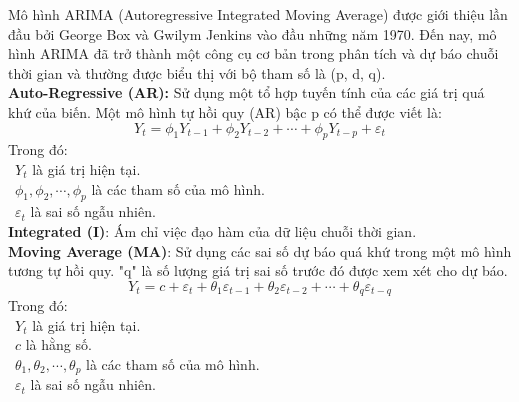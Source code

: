 Mô hình ARIMA (Autoregressive Integrated Moving Average) được giới thiệu lần đầu bởi George Box và Gwilym Jenkins vào đầu những năm 1970. Đến nay, mô hình ARIMA đã trở thành một công cụ cơ bản trong phân tích và dự báo chuỗi thời gian và thường được biểu thị với bộ tham số là (p, d, q).\\
\textbf{Auto-Regressive (AR):} Sử dụng một tổ hợp tuyến tính của các giá trị quá khứ của biến. Một mô hình tự hồi quy (AR) bậc p có thể được viết là:
\[
Y_{t}=\phi_{1}Y_{t-1}+\phi_{2}Y_{t-2}+\cdots+\phi_{p}Y_{t-p}+\varepsilon_{t}
\]
Trong đó:\\
    \indent\textbullet\ \(Y_{t}\) là giá trị hiện tại.\\
    \indent\textbullet\ \(\phi_{1},\phi_{2},\cdots,\phi_{p}\) là các tham số của mô hình.\\
    \indent\textbullet\ \(\varepsilon_{t}\) là sai số ngẫu nhiên.\\
\textbf{Integrated (I)}: Ám chỉ việc đạo hàm của dữ liệu chuỗi thời gian.\\
\textbf{Moving Average (MA)}: Sử dụng các sai số dự báo quá khứ trong một mô hình tương tự hồi quy. "q" là số lượng giá trị sai số trước đó được xem xét cho dự báo.
\[
Y_{t}=c+\varepsilon_{t}+\theta_{1}\varepsilon_{t-1}+\theta_{2}\varepsilon_{t-2}+ \cdots+ \theta_{q}\varepsilon_{t-q}
\]
Trong đó:\\
    \indent\textbullet\ \(Y_{t}\) là giá trị hiện tại.\\
    \indent\textbullet\ \(c\) là hằng số.\\
    \indent\textbullet\ \(\theta_{1},\theta_{2},\cdots,\theta_{p}\) là các tham số của mô hình.\\
    \indent\textbullet\ \(\varepsilon_{t}\) là sai số ngẫu nhiên.